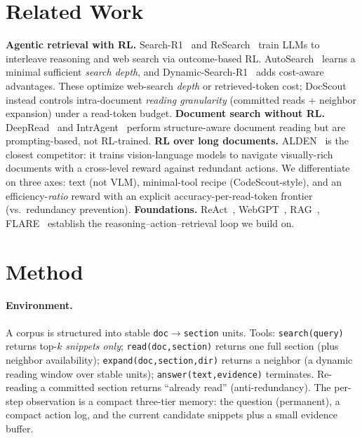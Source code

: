 \documentclass[10pt,twocolumn]{article}
\begin{document}
\section{Related Work}
\textbf{Agentic retrieval with RL.} Search-R1~\cite{searchr1} and ReSearch~\cite{research} train LLMs to interleave reasoning and web search via outcome-based RL. AutoSearch~\cite{autosearch} learns a minimal sufficient \emph{search depth}, and Dynamic-Search-R1~\cite{dynsearchr1} adds cost-aware advantages. These optimize web-search \emph{depth} or retrieved-token cost; DocScout instead controls intra-document \emph{reading granularity} (committed reads + neighbor expansion) under a read-token budget. \textbf{Document search without RL.} DeepRead~\cite{deepread} and IntrAgent~\cite{intragent} perform structure-aware document reading but are prompting-based, not RL-trained. \textbf{RL over long documents.} ALDEN~\cite{alden} is the closest competitor: it trains vision-language models to navigate visually-rich documents with a cross-level reward against redundant actions. We differentiate on three axes: text (not VLM), minimal-tool recipe (CodeScout-style), and an efficiency-\emph{ratio} reward with an explicit accuracy-per-read-token frontier (vs.\ redundancy prevention). \textbf{Foundations.} ReAct~\cite{react2023}, WebGPT~\cite{webgpt2022}, RAG~\cite{rag2020}, FLARE~\cite{flare} establish the reasoning--action--retrieval loop we build on.

\section{Method}
\paragraph{Environment.} A corpus is structured into stable \texttt{doc$\to$section} units. Tools: \texttt{search(query)} returns top-$k$ \emph{snippets only}; \texttt{read(doc,section)} returns one full section (plus neighbor availability); \texttt{expand(doc,section,dir)} returns a neighbor (a dynamic reading window over stable units); \texttt{answer(text,evidence)} terminates. Re-reading a committed section returns ``already read'' (anti-redundancy). The per-step observation is a compact three-tier memory: the question (permanent), a compact action log, and the current candidate snippets plus a small evidence buffer.
\end{document}
